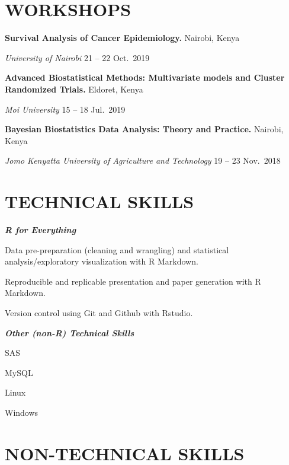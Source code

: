 \documentclass[13pt,]{article}
\providecommand{\tightlist}{%
  \setlength{\itemsep}{0pt}\setlength{\parskip}{0pt}}
\renewenvironment{itemize}{
  \begin{list}{}{
    \setlength{\leftmargin}{1.5em}
  }
}{
  \end{list}
}
\begin{document}
\hypertarget{workshops}{%
\section{\texorpdfstring{\textbf{WORKSHOPS}}{WORKSHOPS}}\label{workshops}}

\textbf{Survival Analysis of Cancer Epidemiology. } \hfill Nairobi,
Kenya

\emph{University of Nairobi} \hfill 21 -- 22 Oct.~2019

\textbf{Advanced Biostatistical Methods: Multivariate models and Cluster
Randomized Trials. } \hfill Eldoret, Kenya

\emph{Moi University} \hfill 15 -- 18 Jul.~2019

\textbf{Bayesian Biostatistics Data Analysis: Theory and Practice. }
\hfill Nairobi, Kenya

\emph{Jomo Kenyatta University of Agriculture and Technology} \hfill 19
-- 23 Nov.~2018

\hypertarget{technical-skills}{%
\section{\texorpdfstring{\textbf{TECHNICAL
SKILLS}}{TECHNICAL SKILLS}}\label{technical-skills}}

\emph{\textbf{R for Everything}}

\begin{itemize}
\tightlist
\item
  Data pre-preparation (cleaning and wrangling) and statistical
  analysis/exploratory visualization with R Markdown.
\item
  Reproducible and replicable presentation and paper generation with R
  Markdown.
\item
  Version control using Git and Github with Rstudio.
\end{itemize}

\emph{\textbf{Other (non-R) Technical Skills}}

\begin{itemize}
\tightlist
\item
  SAS
\item
  MySQL
\item
  Linux
\item
  Windows
\end{itemize}

\hypertarget{non-technical-skills}{%
\section{\texorpdfstring{\textbf{NON-TECHNICAL
SKILLS}}{NON-TECHNICAL SKILLS}}\label{non-technical-skills}}
\end{document}
